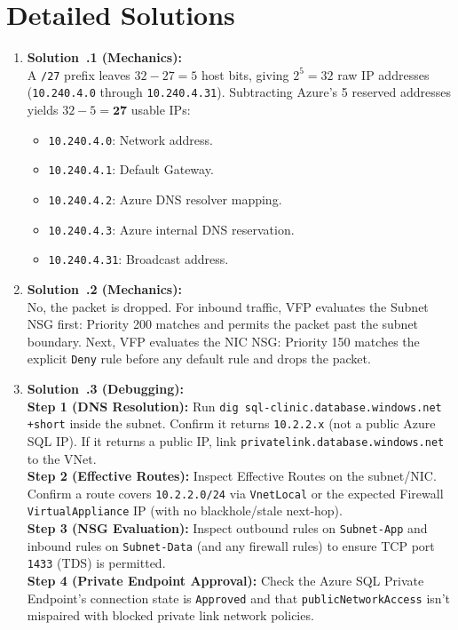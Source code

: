 \section{Detailed Solutions}
\begin{enumerate}[leftmargin=18pt]
  \item \textbf{Solution~\thechapter.1 (Mechanics):}\\
  A \texttt{/27} prefix leaves $32 - 27 = 5$ host bits, giving $2^5 = 32$ raw IP addresses (\texttt{10.240.4.0} through \texttt{10.240.4.31}). Subtracting Azure's 5 reserved addresses yields $32 - 5 = \mathbf{27}$ usable IPs:
  \begin{itemize}[leftmargin=12pt]
    \item \texttt{10.240.4.0}: Network address.
    \item \texttt{10.240.4.1}: Default Gateway.
    \item \texttt{10.240.4.2}: Azure DNS resolver mapping.
    \item \texttt{10.240.4.3}: Azure internal DNS reservation.
    \item \texttt{10.240.4.31}: Broadcast address.
  \end{itemize}

  \item \textbf{Solution~\thechapter.2 (Mechanics):}\\
  No, the packet is dropped. For inbound traffic, VFP evaluates the Subnet NSG first: Priority 200 matches and permits the packet past the subnet boundary. Next, VFP evaluates the NIC NSG: Priority 150 matches the explicit \texttt{Deny} rule before any default rule and drops the packet.

  \item \textbf{Solution~\thechapter.3 (Debugging):}\\
  \textbf{Step 1 (DNS Resolution):} Run \texttt{dig sql-clinic.database.windows.net +short} inside the subnet. Confirm it returns \texttt{10.2.2.x} (not a public Azure SQL IP). If it returns a public IP, link \texttt{privatelink.database.windows.net} to the VNet.\\
  \textbf{Step 2 (Effective Routes):} Inspect Effective Routes on the subnet/NIC. Confirm a route covers \texttt{10.2.2.0/24} via \texttt{VnetLocal} or the expected Firewall \texttt{VirtualAppliance} IP (with no blackhole/stale next-hop).\\
  \textbf{Step 3 (NSG Evaluation):} Inspect outbound rules on \texttt{Subnet-App} and inbound rules on \texttt{Subnet-Data} (and any firewall rules) to ensure TCP port \texttt{1433} (TDS) is permitted.\\
  \textbf{Step 4 (Private Endpoint Approval):} Check the Azure SQL Private Endpoint's connection state is \texttt{Approved} and that \texttt{publicNetworkAccess} isn't mispaired with blocked private link network policies.


\end{enumerate}
